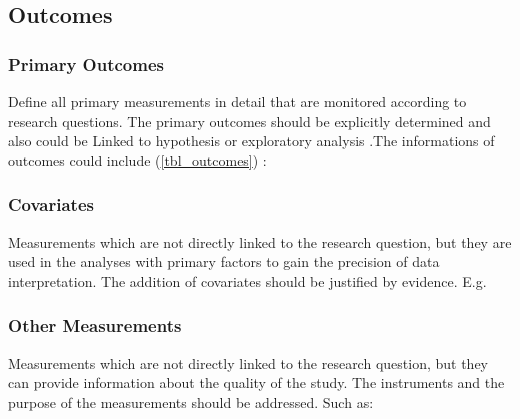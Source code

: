 \subsection{Outcomes}

\subsubsection{Primary Outcomes}
\begin{prereg}
\begin{instruction}
Define all primary measurements in detail that are monitored according to research questions. The primary outcomes should be explicitly determined and also could be Linked to hypothesis or exploratory analysis .The informations of outcomes could include (\cref{tbl_outcomes}) :
\end{instruction}
\end{prereg}




\subsubsection{Covariates}
\begin{prereg}
\begin{instruction}
Measurements which are not directly linked to the research question, but they are used in the analyses with primary factors to gain the precision of data interpretation. The addition of covariates should be justified by evidence. E.g. 
\end{instruction}
\end{prereg}


\subsubsection{Other Measurements}
\begin{prereg}
\begin{instruction}
Measurements which are not directly linked to the research question, but they can provide information about the quality of the study. The instruments and the purpose of the measurements should be addressed. Such as:
\end{instruction}
\end{prereg}
